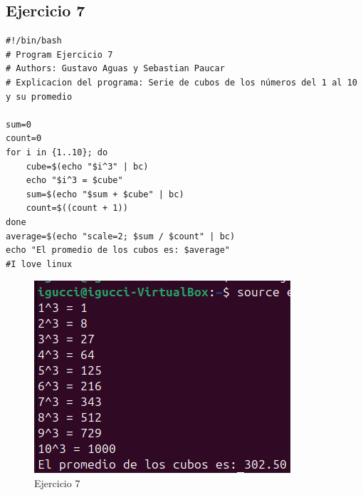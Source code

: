 \documentclass[11pt,twoside]{book}
\begin{document}
\subsection{Ejercicio 7}
\begin{lstlisting}
#!/bin/bash
# Program Ejercicio 7
# Authors: Gustavo Aguas y Sebastian Paucar
# Explicacion del programa: Serie de cubos de los números del 1 al 10 y su promedio

sum=0
count=0
for i in {1..10}; do
    cube=$(echo "$i^3" | bc)
    echo "$i^3 = $cube"
    sum=$(echo "$sum + $cube" | bc)
    count=$((count + 1))
done
average=$(echo "scale=2; $sum / $count" | bc)
echo "El promedio de los cubos es: $average"
#I love linux
\end{lstlisting}
\begin{figure}
    \centering
    \includegraphics[width=0.75\linewidth]{series/ej7.png}
    \caption{Ejercicio 7}
\end{figure}
\newpage
\end{document}

